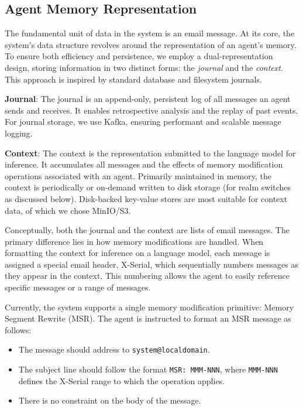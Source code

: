 \subsection{Agent Memory Representation}

The fundamental unit of data in the system is an email message. At its core, the system's data structure revolves around the representation of an agent's memory. To ensure both efficiency and persistence, we employ a dual-representation design, storing information in two distinct forms: the \emph{journal} and the \emph{context}. This approach is inspired by standard database and filesystem journals.


{\bf Journal}: 
The journal is an append-only, persistent log of all messages an agent sends and receives. It enables retrospective analysis and the replay of past events. For journal storage, we use Kafka, ensuring performant and scalable message logging.

{\bf Context}: 
The context is the representation submitted to the language model for inference. It accumulates all messages and the effects of memory modification operations associated with an agent. Primarily maintained in memory, the context is periodically or on-demand written to disk storage (for realm switches as discussed below). Disk-backed key-value stores are most suitable for context data, of which we chose MinIO/S3.

Conceptually, both the journal and the context are lists of email messages. The primary difference lies in how memory modifications are handled.  When formatting the context for inference on a language model, each message is assigned a special email header, X-Serial, which sequentially numbers messages as they appear in the context. This numbering allows the agent to easily reference specific messages or a range of messages.

Currently, the system supports a single memory modification primitive: Memory Segment Rewrite (MSR). The agent is instructed to format an MSR message as follows:

\begin{itemize}
    \item The message should address to \texttt{system@localdomain}.
    \item The subject line should follow the format \texttt{MSR: MMM-NNN}, where \texttt{MMM-NNN} defines the X-Serial range to which the operation applies.
    \item There is no constraint on the body of the message.
\end{itemize}

